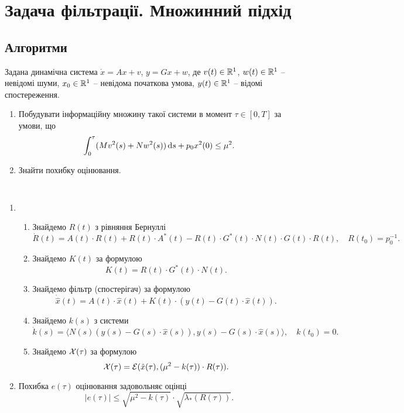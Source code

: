 \section{Задача фільтрації. Множинний підхід}

\subsection{Алгоритми}

\begin{problem*}
	Задана динамічна система $\dot x = A x + v$, $y = G x + w$, де $v(t) \in \mathbb{R}^1$, $w(t) \in \mathbb{R}^1$ -- невідомі шуми, $x_0 \in \mathbb{R}^1$ -- невідома початкова умова, $y(t) \in \mathbb{R}^1$ -- відомі спостереження. 

	\begin{enumerate}
		\item Побудувати інформаційну множину такої системи в момент $\tau \in [0, T]$ за умови, що \[ \int_0^\tau (Mv^2(s) + Nw^2(s)) \mathop{}\!\mathrm{d} s + p_0x^2(0) \le \mu^2. \]
		\item Знайти похибку оцінювання.
	\end{enumerate}
\end{problem*}

\begin{algorithm} \tt
	\begin{enumerate}
		\item \begin{enumerate}
			\item Знайдемо $R(t)$ з рівняння Бернуллі \[\dot R (t)= A (t) \cdot R (t)+ R (t) \cdot A^* (t)- R (t) \cdot G^* (t) \cdot N (t) \cdot G (t) \cdot R(t), \quad R(t_0) = p_0^{-1}. \]
			\item Знайдемо $K(t)$ за формулою \[K (t)= R (t) \cdot G^* (t) \cdot N(t).\]
			\item Знайдемо фільтр (спостерігач) за формулою \[ \dot{\hat{x}} (t) = A (t) \cdot \hat x (t) + K (t) \cdot (y (t) - G (t) \cdot \hat x (t)). \]
			\item Знайдемо $k(s)$ з системи \[ \dot k (s) = \langle N(s) (y(s) - G(s) \cdot \hat x(s)), y(s) - G(s) \cdot \hat x(s)\rangle, \quad k(t_0) = 0. \]
			\item Знайдемо $\mathcal{X}(\tau)$ за формулою \[ \mathcal{X}(\tau) = \mathcal{E} (\hat x(\tau), (\mu^2 - k(\tau)) \cdot R(\tau)). \]
		\end{enumerate}
		\item Похибка $e(\tau)$ оцінювання задовольняє оцінці \[ |e(\tau)| \le \sqrt{\mu^2-k(\tau)} \cdot \sqrt{\lambda_* (R(\tau))}.\]
	\end{enumerate}
\end{algorithm}
